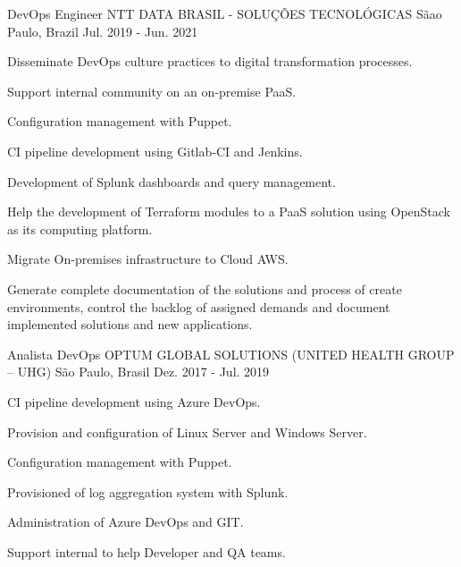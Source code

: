 \begin{cventries}
  \cventry
    {DevOps Engineer} %
    {NTT DATA BRASIL - SOLUÇÕES TECNOLÓGICAS} %
    {Sãao Paulo, Brazil} %
    {Jul. 2019 - Jun. 2021} %
    {
      \begin{cvitems} %
        \item {Disseminate DevOps culture practices to digital transformation processes.}
        \item {Support internal community on an on‑premise PaaS.}
        \item {Configuration management with Puppet.}
        \item {CI pipeline development using Gitlab‑CI and Jenkins.}
        \item {Development of Splunk dashboards and query management.}
        \item {Help the development of Terraform modules to a PaaS solution using OpenStack as its computing platform.}
        \item {Migrate On-premises infrastructure to Cloud AWS.}
        \item {Generate complete documentation of the solutions and process of create environments, control the backlog of assigned demands and document implemented solutions and new applications.}
      \end{cvitems}
    }
\break

  \cventry
    {Analista DevOps} %
    {OPTUM GLOBAL SOLUTIONS (UNITED HEALTH GROUP – UHG)} %
    {São Paulo, Brasil} %
    {Dez. 2017 - Jul. 2019} %
    {
      \begin{cvitems} %
        \item {CI pipeline development using Azure DevOps.}
        \item {Provision and configuration of Linux Server and Windows Server.}
        \item {Configuration management with Puppet.}
        \item {Provisioned of log aggregation system with Splunk.}
        \item {Administration of Azure DevOps and GIT.}
        \item {Support internal to help Developer and QA teams.}
      \end{cvitems}
    }


\end{cventries}